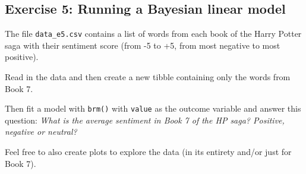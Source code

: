 \documentclass[
]{article}
\begin{document}
\newpage

\subsection{Exercise 5: Running a Bayesian linear
model}\label{exercise-5-running-a-bayesian-linear-model}

The file \texttt{data\_e5.csv} contains a list of words from each book
of the Harry Potter saga with their sentiment score (from -5 to +5, from
most negative to most positive).

Read in the data and then create a new tibble containing only the words
from Book 7.

Then fit a model with \texttt{brm()} with \texttt{value} as the outcome
variable and answer this question: \emph{What is the average sentiment
in Book 7 of the HP saga? Positive, negative or neutral?}

Feel free to also create plots to explore the data (in its entirety
and/or just for Book 7).
\end{document}
